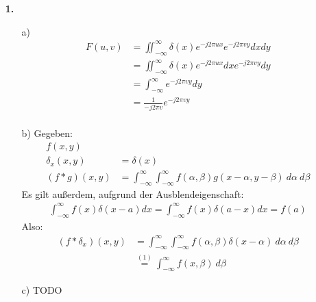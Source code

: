 \documentclass[a4paper,11pt]{article}
\author{\authorinfotitle}
\title{\titleinfo}
\date{\today}
\begin{document}
	\maketitle
	\begin{enumerate}
		\item[\textbf{1.}]
			\begin{enumerate}
				\item[a)]
					\begin{align*}
					F(u,v) &= \iint_{-\infty}^{\infty}\delta(x)e^{-j2\pi ux}e^{-j2\pi vy}dx dy\\
					&=\iint_{-\infty}^{\infty}\delta(x)e^{-j2\pi ux}dx e^{-j2\pi vy}dy\\
					&=\int_{-\infty}^{\infty} e^{-j2\pi vy}dy\\
					&= \frac{1}{-j2\pi v} e^{-j2\pi vy}\\
					\end{align*}
				\item[b)]
					Gegeben:
					\begin{align*}
						f(x, y)& \\
						\delta_x(x, y) &= \delta(x) \\
						(f * g)(x, y) &= \int_{-\infty}^{\infty} \int_{-\infty}^{\infty} f(\alpha, \beta) g(x - \alpha, y - \beta) \ d\alpha \ d\beta
					\end{align*}
					Es gilt außerdem, aufgrund der Ausblendeigenschaft:
					\begin{align}
						\int_{-\infty}^{\infty} f(x) \delta(x - a) dx = \int_{-\infty}^{\infty} f(x) \delta(a - x) dx = f(a)
					\end{align}
					Also:
					\begin{align*}
						(f * \delta_x)(x, y) &= \int_{-\infty}^{\infty} \int_{-\infty}^{\infty} f(\alpha, \beta) \delta(x - \alpha) \ d\alpha \ d\beta \\
						 &\overset{(1)}{=} \int_{-\infty}^{\infty} f(x, \beta) \ d\beta
					\end{align*}
				\item[c)]
					TODO
			\end{enumerate}
	\end{enumerate}
\end{document}
